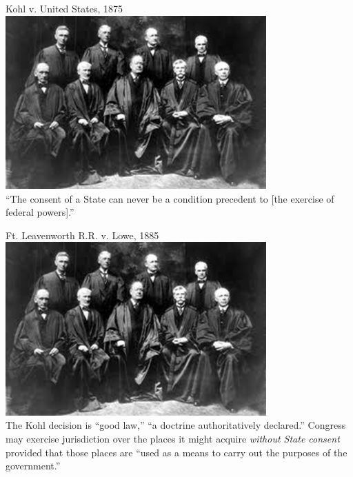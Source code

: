
\begin{frame}{Kohl v. United States, 1875}
    \centering
    \includegraphics[width=0.75\textwidth]{img/sc-1905.png} \\
    { \large ``The consent of a State can never be a condition precedent to [the exercise of federal powers].'' }
\end{frame}

\begin{frame}{Ft. Leavenworth R.R. v. Lowe, 1885}
    \centering
    \includegraphics[width=0.75\textwidth]{img/sc-1905.png} \\
    The Kohl decision is ``good law,'' ``a doctrine authoritatively declared.'' Congress may exercise jurisdiction over the places it might acquire \emph{without State consent} provided that those places are ``used as a means to carry out the purposes of the government.''
\end{frame}

